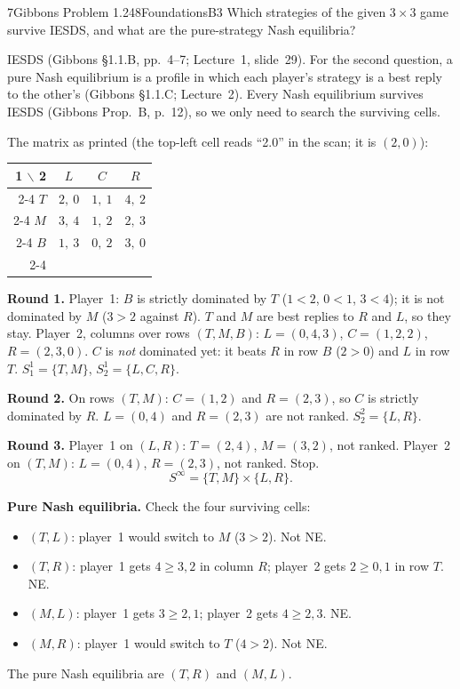 \begin{exsol}{7}{Gibbons Problem 1.2}{48}{Foundations}{B3}
\asked Which strategies of the given $3 \times 3$ game survive IESDS, and what are the
pure-strategy Nash equilibria?

\method IESDS (Gibbons \S1.1.B, pp.~4--7; Lecture~1, slide~29). For the second question, a pure
Nash equilibrium is a profile in which each player's strategy is a best reply to the other's
(Gibbons \S1.1.C; Lecture~2). Every Nash equilibrium survives IESDS (Gibbons Prop.~B, p.~12), so
we only need to search the surviving cells.

\solution
The matrix as printed (the top-left cell reads ``2.0'' in the scan; it is $(2,0)$):
\begin{center}
\begin{tabular}{r|c|c|c|}
\multicolumn{1}{r}{1 $\backslash$ 2} & \multicolumn{1}{c}{$L$} & \multicolumn{1}{c}{$C$} & \multicolumn{1}{c}{$R$}\\ \cline{2-4}
$T$ & $2,\ 0$ & $1,\ 1$ & $4,\ 2$ \\ \cline{2-4}
$M$ & $3,\ 4$ & $1,\ 2$ & $2,\ 3$ \\ \cline{2-4}
$B$ & $1,\ 3$ & $0,\ 2$ & $3,\ 0$ \\ \cline{2-4}
\end{tabular}
\end{center}

\textbf{Round 1.} Player~1: $B$ is strictly dominated by $T$ ($1 < 2$, $0 < 1$, $3 < 4$); it is
not dominated by $M$ ($3 > 2$ against $R$). $T$ and $M$ are best replies to $R$ and $L$, so they
stay. Player~2, columns over rows $(T, M, B)$: $L = (0, 4, 3)$, $C = (1, 2, 2)$, $R = (2, 3, 0)$.
$C$ is \emph{not} dominated yet: it beats $R$ in row $B$ ($2 > 0$) and $L$ in row $T$.
$S_1^1 = \{T, M\}$, $S_2^1 = \{L, C, R\}$.

\textbf{Round 2.} On rows $(T, M)$: $C = (1, 2)$ and $R = (2, 3)$, so $C$ is strictly dominated by
$R$. $L = (0, 4)$ and $R = (2, 3)$ are not ranked. $S_2^2 = \{L, R\}$.

\textbf{Round 3.} Player~1 on $(L, R)$: $T = (2, 4)$, $M = (3, 2)$, not ranked. Player~2 on
$(T, M)$: $L = (0, 4)$, $R = (2, 3)$, not ranked. Stop.
\[
  S^\infty = \{T, M\} \times \{L, R\}.
\]

\textbf{Pure Nash equilibria.} Check the four surviving cells:
\begin{itemize}
  \item $(T, L)$: player~1 would switch to $M$ ($3 > 2$). Not NE.
  \item $(T, R)$: player~1 gets $4 \ge 3, 2$ in column $R$; player~2 gets $2 \ge 0, 1$ in row $T$. NE.
  \item $(M, L)$: player~1 gets $3 \ge 2, 1$; player~2 gets $4 \ge 2, 3$. NE.
  \item $(M, R)$: player~1 would switch to $T$ ($4 > 2$). Not NE.
\end{itemize}
The pure Nash equilibria are $(T, R)$ and $(M, L)$.


\end{exsol}

